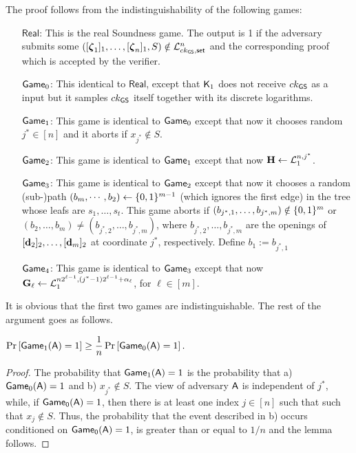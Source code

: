 The proof follows from the indistinguishability of the following games:
\begin{itemize}
\item[\(\mathsf{Real}\):] This is the real Soundness game. The output is 1 if the adversary submits some \(([{\boldsymbol \zeta}_1]_1,\ldots,[{\boldsymbol \zeta}_n]_1,S)\notin\mathcal{L}_{ck_{\mathsf{GS}},\mathsf{set}}^n\) and the corresponding proof which is accepted by the verifier.
\item[\(\mathsf{Game}_0\):] This identical to \(\mathsf{Real}\), except that \(\mathsf{K}_1\) does not receive \(ck_{\mathsf{GS}}\) as a input but
it samples \(ck_{\mathsf{GS}}\) itself together with its discrete logarithms.
\item[\(\mathsf{Game}_1\):] This game is identical to \(\mathsf{Game}_0\) except that now it chooses random \(j^*\in[n]\) and it aborts if \(x_{j^*}\notin S\).
\item[\(\mathsf{Game}_2\):] This game is identical to \(\mathsf{Game}_1\) except that now \(\mathbf{{H}}\gets\mathcal{L}^{n,j^*}_1\).
\item[\(\mathsf{Game}_3\):] This game is identical to \(\mathsf{Game}_2\) except that now it chooses a random (sub-)path $(b_m,\cdots, b_2)\gets\{0,1\}^{m-1}$ (which ignores the first edge) in the tree whose leafs are $s_1,\ldots,s_t$. This game aborts if \((b_{j^*,1},\ldots,b_{j^*,m})\notin\{0,1\}^m\) or \((b_2,\ldots, b_m)\neq(b_{j^*,2},\ldots, b_{j^*,m})\), where \(b_{j^*,2},\ldots,b_{j^*,m}\) are the openings of \([\mathbf{d}_2]_2,\ldots,[\mathbf{d}_m]_2\) at coordinate \(j^*\), respectively. Define $b_1:=b_{j^*,1}$
\item[\(\mathsf{Game}_4\):] This game is identical to \(\mathsf{Game}_3\) except that now \(\mathbf{{G}}_\ell\gets\mathcal{L}_1^{n2^{\ell-1},(j^*-1)2^{\ell-1}+\alpha_\ell}\), for \(\ell\in [m]\).
\end{itemize}

It is obvious that the first two games are indistinguishable. The rest of the argument goes as follows.

\begin{lemma}
\(\Pr\left[ \mathsf{Game}_1(\mathsf{A})=1\right]\geq\dfrac{1}{n}\Pr\left[\mathsf{Game}_0(\mathsf{A})=1\right].\)
\end{lemma}

\begin{proof}  The probability that
 \(\mathsf{Game}_1(\mathsf{A})=1\) is the probability that  a) \(\mathsf{Game}_0(\mathsf{A})=1\) and
b)  \(x_{j^*} \notin S\). The view of adversary \(\mathsf{A}\) is independent of \(j^*\), while, if \(\mathsf{Game_0}(\mathsf{A})=1\), then there is at least one index \(j \in [n]\) such that  
such that  \(x_{j} \notin S\). Thus, 
the probability that the event described in b) occurs conditioned on \(\mathsf{Game_0}(\mathsf{A})=1\), is greater than or equal to \(1/n\) and the lemma follows.
\end{proof}

